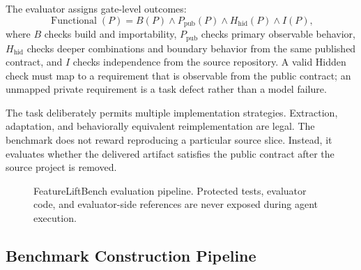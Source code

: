 \documentclass[acmsmall,screen,review,anonymous]{acmart}
\begin{document}
The evaluator assigns gate-level outcomes:
\begin{equation}
  \operatorname{Functional}(P)
  = B(P) \land P_{\mathrm{pub}}(P)
    \land H_{\mathrm{hid}}(P) \land I(P),
  \label{eq:functional}
\end{equation}
where $B$ checks build and importability, $P_{\mathrm{pub}}$ checks primary
observable behavior, $H_{\mathrm{hid}}$ checks deeper combinations and boundary
behavior from the same published contract, and $I$ checks independence from the
source repository. A valid Hidden check must map to a requirement that is
observable from the public contract; an unmapped private requirement is a task
defect rather than a model failure.

The task deliberately permits multiple implementation strategies. Extraction,
adaptation, and behaviorally equivalent reimplementation are legal. The benchmark
does not reward reproducing a particular source slice. Instead, it evaluates
whether the delivered artifact satisfies the public contract after the source
project is removed.

\begin{figure}[t]
  \centering
  \caption{FeatureLiftBench evaluation pipeline. Protected tests, evaluator code,
  and evaluator-side references are never exposed during agent execution.}
  \label{fig:evaluation-pipeline}
\end{figure}

\subsection{Benchmark Construction Pipeline}
\label{sec:construction}
\end{document}
